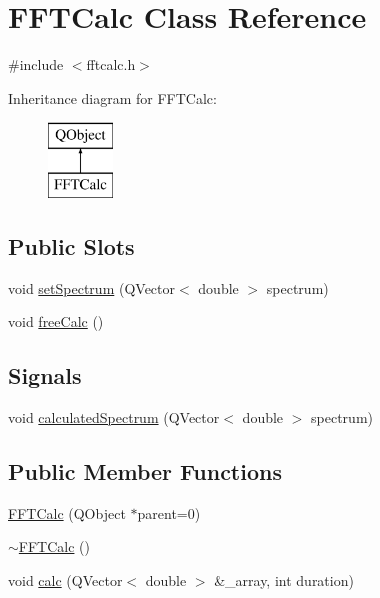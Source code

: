 \hypertarget{class_f_f_t_calc}{\section{F\-F\-T\-Calc Class Reference}
\label{class_f_f_t_calc}
}


{\ttfamily \#include $<$fftcalc.\-h$>$}

Inheritance diagram for F\-F\-T\-Calc\-:\begin{figure}[H]
\begin{center}
\leavevmode
\includegraphics[height=2.000000cm]{class_f_f_t_calc}
\end{center}
\end{figure}
\subsection*{Public Slots}
\begin{DoxyCompactItemize}
\item 
void \hyperlink{class_f_f_t_calc_a630f0941389aa764c341c15a50d6c51a}{set\-Spectrum} (Q\-Vector$<$ double $>$ spectrum)
\item 
void \hyperlink{class_f_f_t_calc_ae12ef5c098a2bb3070a743927ef50da7}{free\-Calc} ()
\end{DoxyCompactItemize}
\subsection*{Signals}
\begin{DoxyCompactItemize}
\item 
void \hyperlink{class_f_f_t_calc_a2c21488cc4fa4985f9152156137db30e}{calculated\-Spectrum} (Q\-Vector$<$ double $>$ spectrum)
\end{DoxyCompactItemize}
\subsection*{Public Member Functions}
\begin{DoxyCompactItemize}
\item 
\hyperlink{class_f_f_t_calc_ae6b220dd66a6df99041680e55746c79e}{F\-F\-T\-Calc} (Q\-Object $\ast$parent=0)
\item 
\hyperlink{class_f_f_t_calc_a4e7a3df6e25f51df91444f562aff6c4c}{$\sim$\-F\-F\-T\-Calc} ()
\item 
void \hyperlink{class_f_f_t_calc_a19ee0f470123aaff939fc6c1ee833080}{calc} (Q\-Vector$<$ double $>$ \&\-\_\-array, int duration)
\end{DoxyCompactItemize}



